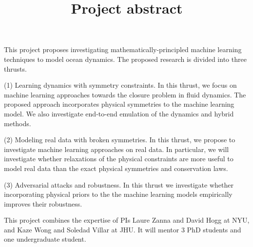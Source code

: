 \documentclass{article}
\title{Project abstract}
\date{}
\begin{document}
\maketitle
This project proposes investigating mathematically-principled machine learning techniques to model ocean dynamics. The proposed research is divided into three thrusts. 

(1) Learning dynamics with symmetry constraints. In this thrust, we focus on machine learning approaches towards the closure problem in fluid dynamics. The proposed approach incorporates physical symmetries to the machine learning model. We also investigate end-to-end emulation of the dynamics and hybrid methods.

(2) Modeling real data with broken symmetries. In this thrust, we propose to investigate machine learning approaches on real data. In particular, we will investigate whether relaxations of the physical constraints are more useful to model real data than the exact physical symmetries and conservation laws.

(3) Adversarial attacks and robustness. In this thrust we investigate whether incorporating physical priors to the the machine learning models empirically improves their robustness.

This project combines the expertise of PIs Laure Zanna and David Hogg at NYU, and Kaze Wong and Soledad Villar at JHU. It will mentor 3 PhD students and one undergraduate student. 
\end{document}
